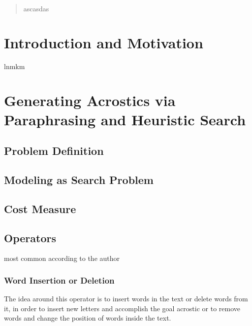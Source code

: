 \documentclass{reportAlternative}
\begin{document}
\begin{abstract}
ascasdas
\end{abstract}

\chapter{Introduction and Motivation}
lnmkm
\chapter{Generating Acrostics via Paraphrasing and Heuristic Search}

\section{Problem Definition}

\section{Modeling as Search Problem}

\section{Cost Measure}

\section{Operators}
most common according to the author

\subsection{Word Insertion or Deletion}
The idea around this operator is to insert words in the text or delete words from it, in order to insert new letters and accomplish the goal acrostic or to remove words and change the position of words inside the text. \par
\end{document}
